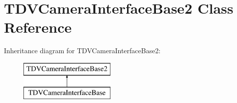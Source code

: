 \hypertarget{classTDVCameraInterfaceBase2}{
\section{TDVCameraInterfaceBase2 Class Reference}
\label{classTDVCameraInterfaceBase2}
}
Inheritance diagram for TDVCameraInterfaceBase2:\begin{figure}[H]
\begin{center}
\leavevmode
\includegraphics[height=2.000000cm]{classTDVCameraInterfaceBase2}
\end{center}
\end{figure}
